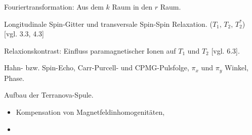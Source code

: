 \documentclass{subfiles}
\begin{document}
    \begin{Frage}
        Fouriertransformation: Aus dem $k$ Raum in den $r$ Raum. 
    \end{Frage}
    \begin{Antwort}
        
    \end{Antwort}

    \begin{Frage}
        Longitudinale Spin-Gitter und transversale Spin-Spin Relaxation. ($T_1$, $T_2$, $T_2^*$) [vgl. 3.3, 4.3]
    \end{Frage}
    \begin{Antwort}
        
    \end{Antwort}

    \begin{Frage}
        Relaxionskontrast: Einfluss paramagnetischer Ionen auf $T_1$ und $T_2$ [vgl. 6.3].
    \end{Frage}
    \begin{Antwort}
        
    \end{Antwort}

    \begin{Frage}
        Hahn- bzw. Spin-Echo, Carr-Purcell- und CPMG-Pulsfolge, $\pi_x$ und $\pi_y$ Winkel, Phase.
    \end{Frage}
    \begin{Antwort}
        
    \end{Antwort}

    \begin{Frage}
        Aufbau der Terranova-Spule.
        \begin{itemize}[label=$\to$]
            \item Kompensation von Magnetfeldinhomogenitäten,
            \item 
        \end{itemize}
    \end{Frage}
    \begin{Antwort}
        
    \end{Antwort}

    \begin{Frage}
        
    \end{Frage}
\end{document}
